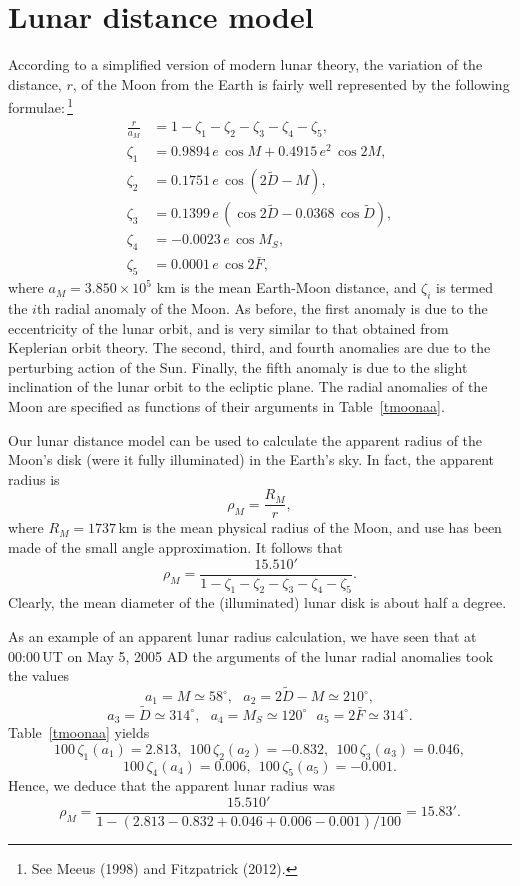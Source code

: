 \section{Lunar distance model}
According to a simplified version of modern lunar theory, the variation of the distance, $r$, of the Moon from the Earth is
fairly well represented by the following formulae:\,\footnote {See  Meeus (1998) and Fitzpatrick (2012). }
\begin{align}\label{e6.13h}
\frac{r}{a_M} &= 1-\zeta_1-\zeta_2-\zeta_3-\zeta_4-\zeta_5,\\[0.5ex]
\zeta_1 &= 0.9894\,e\,\cos M + 0.4915\,e^2\,\cos 2M,\\[0.5ex]
\zeta_2 &= 0.1751\,e\,\cos (2\tilde{D} - M),\\[0.5ex]
\zeta_3 &= 0.1399\,e\,(\cos 2\tilde{D} - 0.0368\,\cos \tilde{D}),\\[0.5ex]
\zeta_4 &= -0.0023\,e\,\cos M_S,\\[0.5ex]
\zeta_5&=  0.0001\,e\,\cos 2 \bar{F},
\end{align}
where $a_M=3.850\times 10^5$ km is the mean Earth-Moon distance, and $\zeta_i$ is termed the $i$th radial anomaly of the Moon. 
As before, the first anomaly is due to the eccentricity of the lunar orbit, and is very similar to that obtained from Keplerian orbit theory.
The second, third, and fourth anomalies are due to the perturbing action of the Sun. Finally, the fifth anomaly is due to the slight inclination of
the lunar orbit to the ecliptic plane.  The radial anomalies of the Moon are specified as functions of their arguments in Table~\ref{tmoonaa}. 

Our lunar distance model can be used to calculate the apparent radius of the Moon's disk (were it fully illuminated) in the Earth's sky. 
In fact, the apparent radius is
\begin{equation}
\rho_M= \frac{R_M}{r},
\end{equation}
where $R_M= 1737$\,km is the mean physical radius of the Moon, and use has been made of the small angle approximation. It follows that
\begin{equation}\label{rhom}
\rho_M= \frac{15.510'}{1-\zeta_1-\zeta_2-\zeta_3-\zeta_4-\zeta_5}.
\end{equation}
Clearly, the mean diameter of the (illuminated) lunar disk is about half a degree. 

As an example of an apparent lunar radius calculation, we have seen that at 00:00\,UT on May 5, 2005 AD the arguments of the
lunar radial anomalies took the values 
$$
a_1=M\simeq 58^\circ,~~~a_2=2\tilde{D}-M \simeq 210^\circ,
$$ 
$$
a_3=\tilde{D}\simeq 314^\circ,~~~a_4=M_S\simeq 120^\circ~~~a_5=2\bar{F} \simeq 314^\circ.
$$ 
Table~\ref{tmoonaa} 
yields 
$$
100\,\zeta_1(a_1)=2.813,~~100\,\zeta_2(a_2)= -0.832,~~100\,\zeta_3(a_3) = 0.046,
$$
$$100\,\zeta_4(a_4)=0.006,~~100\,\zeta_5(a_5)= -0.001.
$$
Hence, we deduce that the apparent lunar radius was
\begin{equation*}
\rho_M = \frac{15.510'}{1-(2.813-0.832+0.046+0.006-0.001)/100}= 15.83'.
\end{equation*}

